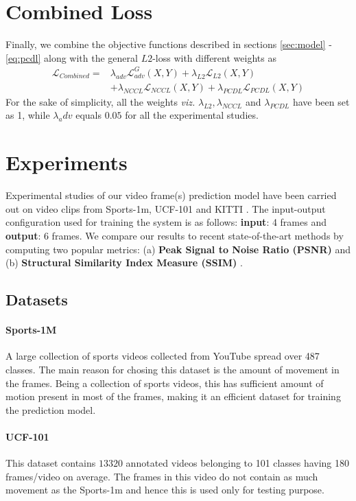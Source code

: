 \documentclass{article}
\begin{document}
\section{Combined Loss}
\label{sec:combloss}
Finally, we combine the objective functions described in sections \ref{sec:model} - \ref{eq:pcdl} along with the general $ L2 $-loss with different weights as
\begin{equation}
	\begin{split}
	\mathcal{L}_{Combined} = & 	\lambda_{adv}\mathcal{L}_{adv}^G (X, Y) + \lambda_{L2} \mathcal{L}_{L2} (X, Y) \\
	& + \lambda_{NCCL} \mathcal{L}_{NCCL} (X, Y) + \lambda_{PCDL} \mathcal{L}_{PCDL} (X, Y)
	\end{split}
	\label{eq:combined}
\end{equation}
For the sake of simplicity, all the weights \textit{viz.} $\lambda_{L2}, \lambda_{NCCL} $ and $ \lambda_{PCDL} $ have been set as 1, while $ \lambda_adv $ equals $ 0.05 $ for all the experimental studies.

\section{Experiments}
  \label{sec:experiments}
  Experimental studies of our video frame(s) prediction model have been carried out on video clips from Sports-1m, UCF-101 \cite{soomro2012ucf101} and KITTI \cite{Geiger2013IJRR}. The input-output configuration used for training the system is as follows: \textbf{input}: 4 frames and \textbf{output}: 6 frames. We compare our results to recent state-of-the-art methods by computing two popular metrics: (a) \textbf{Peak Signal to Noise Ratio (PSNR)} and (b) \textbf{Structural Similarity Index Measure (SSIM)} \cite{wang2004image}.

\subsection{Datasets}
  \paragraph{Sports-1M} A large collection of sports videos collected from YouTube spread over 487 classes. The main reason for chosing this dataset is the amount of movement in the frames. Being a collection of sports videos, this has sufficient amount of motion present in most of the frames, making it an efficient dataset for training the prediction model.
  \paragraph{UCF-101} This dataset contains $ 13320 $ annotated videos belonging to 101 classes having 180 frames/video on average. The frames in this video do not contain as much movement as the Sports-1m and hence this is used only for testing purpose.
\end{document}
